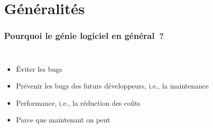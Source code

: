\documentclass{beamer}
\begin{document}
    \section{Généralités}\label{sec:generalites}
    \begin{frame}
        \transdissolve
        \frametitle{Pourquoi le génie logiciel en général~?}
        \begin{columns}
            \begin{itemize}

                \item Éviter les bugs
                \item Prévenir les bugs des futurs développeurs, i.e., la maintenance
                \item Performance, i.e., la réduction des coûts
                \item Parce que maintenant on peut
            \end{itemize}
            \centering
        \end{columns}
    \end{frame}
\end{document}

